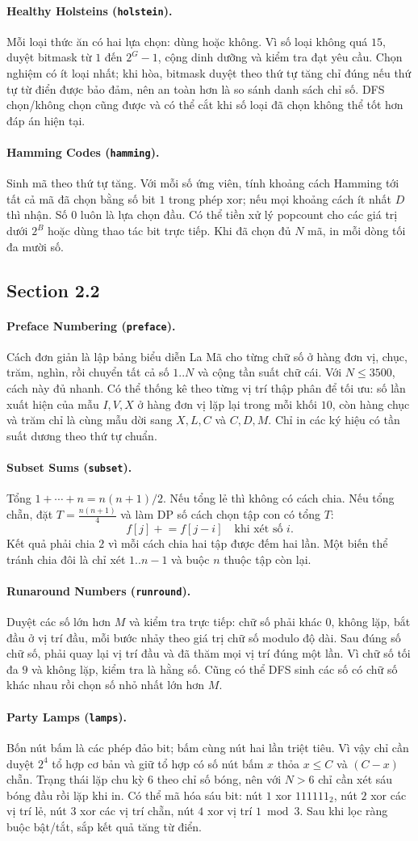 \documentclass[11pt]{article}
\newcommand{\problem}[2]{\paragraph{#1 (\texttt{#2}).}}
\begin{document}
\problem{Healthy Holsteins}{holstein}
Mỗi loại thức ăn có hai lựa chọn: dùng hoặc không. Vì số loại không quá \(15\), duyệt bitmask từ \(1\) đến \(2^G-1\), cộng dinh dưỡng và kiểm tra đạt yêu cầu. Chọn nghiệm có ít loại nhất; khi hòa, bitmask duyệt theo thứ tự tăng chỉ đúng nếu thứ tự từ điển được bảo đảm, nên an toàn hơn là so sánh danh sách chỉ số. DFS chọn/không chọn cũng được và có thể cắt khi số loại đã chọn không thể tốt hơn đáp án hiện tại.

\problem{Hamming Codes}{hamming}
Sinh mã theo thứ tự tăng. Với mỗi số ứng viên, tính khoảng cách Hamming tới tất cả mã đã chọn bằng số bit \(1\) trong phép \(\text{xor}\); nếu mọi khoảng cách ít nhất \(D\) thì nhận. Số \(0\) luôn là lựa chọn đầu. Có thể tiền xử lý popcount cho các giá trị dưới \(2^B\) hoặc dùng thao tác bit trực tiếp. Khi đã chọn đủ \(N\) mã, in mỗi dòng tối đa mười số.

\subsection*{Section 2.2}

\problem{Preface Numbering}{preface}
Cách đơn giản là lập bảng biểu diễn La Mã cho từng chữ số ở hàng đơn vị, chục, trăm, nghìn, rồi chuyển tất cả số \(1..N\) và cộng tần suất chữ cái. Với \(N\le 3500\), cách này đủ nhanh. Có thể thống kê theo từng vị trí thập phân để tối ưu: số lần xuất hiện của mẫu \(I,V,X\) ở hàng đơn vị lặp lại trong mỗi khối \(10\), còn hàng chục và trăm chỉ là cùng mẫu dời sang \(X,L,C\) và \(C,D,M\). Chỉ in các ký hiệu có tần suất dương theo thứ tự chuẩn.

\problem{Subset Sums}{subset}
Tổng \(1+\cdots+n=n(n+1)/2\). Nếu tổng lẻ thì không có cách chia. Nếu tổng chẵn, đặt \(T=\frac{n(n+1)}4\) và làm DP số cách chọn tập con có tổng \(T\):
\[
  f[j]\mathrel{+}=f[j-i]\quad\text{khi xét số }i.
\]
Kết quả phải chia \(2\) vì mỗi cách chia hai tập được đếm hai lần. Một biến thể tránh chia đôi là chỉ xét \(1..n-1\) và buộc \(n\) thuộc tập còn lại.

\problem{Runaround Numbers}{runround}
Duyệt các số lớn hơn \(M\) và kiểm tra trực tiếp: chữ số phải khác \(0\), không lặp, bắt đầu ở vị trí đầu, mỗi bước nhảy theo giá trị chữ số modulo độ dài. Sau đúng số chữ số, phải quay lại vị trí đầu và đã thăm mọi vị trí đúng một lần. Vì chữ số tối đa \(9\) và không lặp, kiểm tra là hằng số. Cũng có thể DFS sinh các số có chữ số khác nhau rồi chọn số nhỏ nhất lớn hơn \(M\).

\problem{Party Lamps}{lamps}
Bốn nút bấm là các phép đảo bit; bấm cùng nút hai lần triệt tiêu. Vì vậy chỉ cần duyệt \(2^4\) tổ hợp cơ bản và giữ tổ hợp có số nút bấm \(x\) thỏa \(x\le C\) và \((C-x)\) chẵn. Trạng thái lặp chu kỳ \(6\) theo chỉ số bóng, nên với \(N>6\) chỉ cần xét sáu bóng đầu rồi lặp khi in. Có thể mã hóa sáu bit: nút \(1\) xor \(111111_2\), nút \(2\) xor các vị trí lẻ, nút \(3\) xor các vị trí chẵn, nút \(4\) xor vị trí \(1\bmod 3\). Sau khi lọc ràng buộc bật/tắt, sắp kết quả tăng từ điển.
\end{document}
